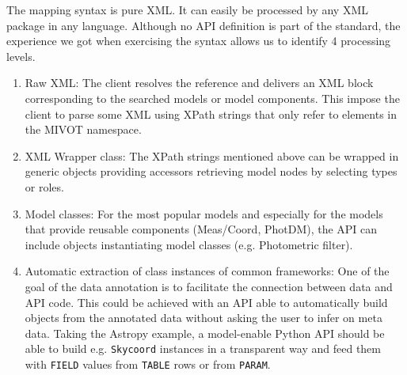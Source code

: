 The mapping syntax is pure XML. It can easily be processed by any XML package in any language.
Although no API definition is part of the standard, the experience we got when exercising the syntax allows us to identify 
4 processing levels.


\begin{enumerate} 
  \item Raw XML: The client resolves the reference and delivers an XML block corresponding to the searched models or model components. 
          This %
          impose the client to parse some XML using XPath strings that only refer to elements in the MIVOT namespace.
  \item XML Wrapper class: The XPath strings mentioned above can be wrapped in generic objects providing accessors retrieving model nodes by selecting types or roles. 
  \item Model classes: For the most popular models and especially for the models that provide reusable components (Meas/Coord, PhotDM), the API can include objects instantiating model classes (e.g. Photometric filter).
  \item Automatic extraction of class instances of common frameworks: One of the goal of the data annotation is to facilitate the connection between data and API code. This could be achieved with an API able to automatically build objects from the annotated data without asking the user to infer on meta data. Taking the Astropy example, a model-enable Python API should be able to build e.g. \texttt{Skycoord} instances in a transparent way and feed them with \texttt{FIELD} values from \texttt{TABLE} rows or from \texttt{PARAM}.
 \end{enumerate}

